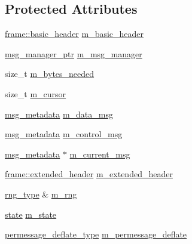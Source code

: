 \subsection*{Protected Attributes}
\begin{DoxyCompactItemize}
\item 
\hyperlink{structwebsocketpp_1_1frame_1_1basic__header}{frame\+::basic\+\_\+header} \hyperlink{classwebsocketpp_1_1processor_1_1hybi13_aa1b5aeeb8c4be9460854b1eb972a1563}{m\+\_\+basic\+\_\+header}
\item 
\hyperlink{classwebsocketpp_1_1processor_1_1hybi13_a435c6586650330e0f1685da6b4e70a68}{msg\+\_\+manager\+\_\+ptr} \hyperlink{classwebsocketpp_1_1processor_1_1hybi13_a023029768eda304f37698bf63aaa7fdc}{m\+\_\+msg\+\_\+manager}
\item 
size\+\_\+t \hyperlink{classwebsocketpp_1_1processor_1_1hybi13_a6e31d9b2d955fbdbd2a05ce325f06326}{m\+\_\+bytes\+\_\+needed}
\item 
size\+\_\+t \hyperlink{classwebsocketpp_1_1processor_1_1hybi13_a4fd9db5f39ff7ca0796c456b83b74887}{m\+\_\+cursor}
\item 
\hyperlink{structwebsocketpp_1_1processor_1_1hybi13_1_1msg__metadata}{msg\+\_\+metadata} \hyperlink{classwebsocketpp_1_1processor_1_1hybi13_a7ace361da2e05291aeb029956f20aee3}{m\+\_\+data\+\_\+msg}
\item 
\hyperlink{structwebsocketpp_1_1processor_1_1hybi13_1_1msg__metadata}{msg\+\_\+metadata} \hyperlink{classwebsocketpp_1_1processor_1_1hybi13_a684c7ab5a31c2becad136063e0cd48a9}{m\+\_\+control\+\_\+msg}
\item 
\hyperlink{structwebsocketpp_1_1processor_1_1hybi13_1_1msg__metadata}{msg\+\_\+metadata} $\ast$ \hyperlink{classwebsocketpp_1_1processor_1_1hybi13_a2a1554b49e53c61931e6912bec35c815}{m\+\_\+current\+\_\+msg}
\item 
\hyperlink{structwebsocketpp_1_1frame_1_1extended__header}{frame\+::extended\+\_\+header} \hyperlink{classwebsocketpp_1_1processor_1_1hybi13_a7d11d41110cd4b4e746a55ecd9faaaf1}{m\+\_\+extended\+\_\+header}
\item 
\hyperlink{classwebsocketpp_1_1processor_1_1hybi13_ad6e55eeed8ec7329fb71abceb4159a5c}{rng\+\_\+type} \& \hyperlink{classwebsocketpp_1_1processor_1_1hybi13_a3e6ee5afc8a635c0a410f678bda8ea84}{m\+\_\+rng}
\item 
\hyperlink{classwebsocketpp_1_1processor_1_1hybi13_a56fee5ffbb0b5c2c0708be2338e0740d}{state} \hyperlink{classwebsocketpp_1_1processor_1_1hybi13_a4660c14a2a241a2439fb3aa497ab5886}{m\+\_\+state}
\item 
\hyperlink{classwebsocketpp_1_1processor_1_1hybi13_a9e82fb49b851fa427f409aab42d7b6a9}{permessage\+\_\+deflate\+\_\+type} \hyperlink{classwebsocketpp_1_1processor_1_1hybi13_a9103ac43ba28b3b3e5cedf519b1c67c5}{m\+\_\+permessage\+\_\+deflate}
\end{DoxyCompactItemize}


